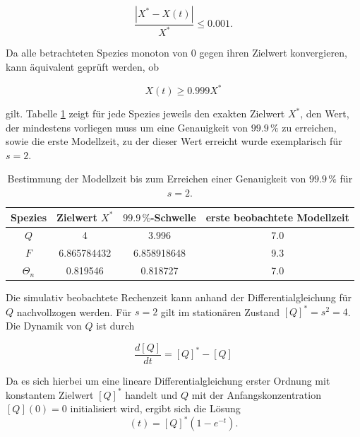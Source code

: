 \begin{equation}
    \frac{|X^* - X(t)|}{X^*}
    \leq
    0.001.
\end{equation}

Da alle betrachteten Spezies monoton von \(0\) gegen ihren Zielwert
konvergieren, kann äquivalent geprüft werden, ob

\begin{equation}
    X(t)\geq 0.999X^*
\end{equation}

gilt. Tabelle \ref{tab:studie2_rechenzeit} zeigt für jede Spezies jeweils den exakten Zielwert \(X^*\), den Wert, der mindestens vorliegen muss um eine Genauigkeit von \(99.9\,\%\) zu erreichen, sowie die erste Modellzeit, zu der dieser Wert erreicht wurde exemplarisch für \(s=2\). 

\begin{table}[h]
    \centering
    \begin{tabular}{c|c|c|c}
        Spezies &
        Zielwert \(X^*\) &
        \(99.9\,\%\)-Schwelle  &
        erste beobachtete Modellzeit \\

        \hline
        \(Q\)        & 4           & 3.996       & 7.0 \\
        \(F\)        & 6.865784432 & 6.858918648 & 9.3 \\
        \(\Theta_n\) & 0.819546    & 0.818727    & 7.0 \\
    \end{tabular}
    \caption{Bestimmung der Modellzeit bis zum Erreichen einer Genauigkeit von \(99.9\,\%\) für \(s=2\).}
    \label{tab:studie2_rechenzeit}
\end{table}

Die simulativ beobachtete Rechenzeit kann anhand der Differentialgleichung
für \(Q\) nachvollzogen werden. Für \(s=2\) gilt im stationären Zustand
$[Q]^* = s^2 = 4$. Die Dynamik von \(Q\) ist durch

\begin{equation}
    \frac{d[Q]}{dt}
    =
    [Q]^*-[Q]
\end{equation}

Da es sich hierbei um eine lineare Differentialgleichung erster Ordnung
mit konstantem Zielwert \([Q]^*\) handelt und \(Q\) mit der
Anfangskonzentration \([Q](0)=0\) initialisiert wird, ergibt sich die
Lösung
\begin{equation}
    [Q](t)
    =
    [Q]^*
    \left(
        1-e^{-t}
    \right).
    \label{eq:Q_loesung}
\end{equation}

